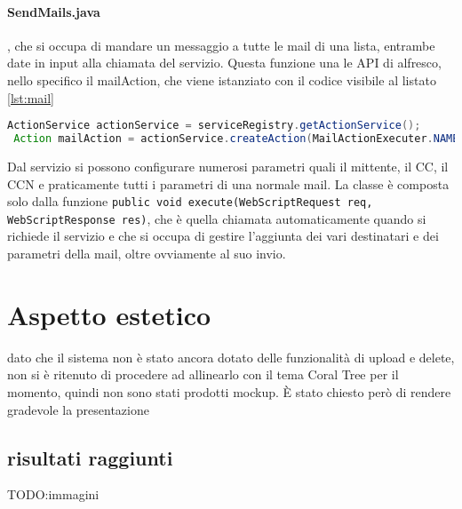 \paragraph{SendMails.java}, che si occupa di mandare un messaggio a tutte le mail di una lista, entrambe date in input alla chiamata del servizio. Questa funzione una le API di alfresco, nello specifico il mailAction, che viene istanziato con il codice visibile al listato \ref{lst:mail}
\begin{lstlisting}[language=Java,caption=set dell'actionservice per le mail,label=lst:mail]
 ActionService actionService = serviceRegistry.getActionService();
 Action mailAction = actionService.createAction(MailActionExecuter.NAME);
\end{lstlisting}
Dal servizio si possono configurare numerosi parametri quali il mittente, il CC, il CCN e praticamente tutti i parametri di una normale mail.
La classe è composta solo dalla funzione \texttt{public void execute(WebScriptRequest req, WebScriptResponse res)}, che è quella chiamata automaticamente quando si richiede il servizio e che si occupa di gestire l'aggiunta dei vari destinatari e dei parametri della mail, oltre ovviamente al suo invio.
\section{Aspetto estetico}
dato che il sistema non è stato ancora dotato delle funzionalità di upload e delete, non si è ritenuto di procedere ad allinearlo con il tema Coral Tree per il momento, quindi non sono stati prodotti mockup. È stato chiesto però di rendere gradevole la presentazione
\subsection{risultati raggiunti}
TODO:immagini